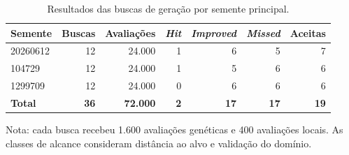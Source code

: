 \begin{table}[!htbp]
\centering
\caption{Resultados das buscas de geração por semente principal.}
\label{tab:res-geracao}
\begin{singlespace}
\normalsize
\setlength{\tabcolsep}{5pt}
\renewcommand{\arraystretch}{1.15}
\begin{tabular}{lrrrrrr}
\hline\hline
\textbf{Semente} & \textbf{Buscas} & \textbf{Avaliações} & \textbf{\textit{Hit}} & \textbf{\textit{Improved}} & \textbf{\textit{Missed}} & \textbf{Aceitas} \\
\hline
20260612 & 12 & 24.000 & 1 & 6 & 5 & 7 \\
104729 & 12 & 24.000 & 1 & 5 & 6 & 6 \\
1299709 & 12 & 24.000 & 0 & 6 & 6 & 6 \\
\textbf{Total} & \textbf{36} & \textbf{72.000} & \textbf{2} & \textbf{17} & \textbf{17} & \textbf{19} \\
\hline\hline
\end{tabular}
\par\smallskip
{\small Nota: cada busca recebeu 1.600 avaliações genéticas e 400 avaliações locais. As classes de alcance consideram distância ao alvo e validação do domínio.\par}
{}
\end{singlespace}
\end{table}
